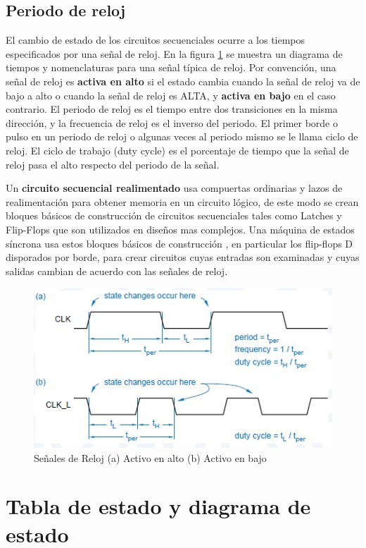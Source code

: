 \documentclass[12pt]{book}
\theoremstyle{definition}
\theoremstyle{remark}
\theoremstyle{plain}
\begin{document}
\subsection{Periodo de reloj}

El cambio de estado de los circuitos secuenciales ocurre a los tiempos especificados por una señal de reloj. En la figura \ref{fig13} se muestra un diagrama de tiempos y nomenclaturas para una señal típica de reloj. Por convención, una señal de reloj es \textbf{activa en alto} si el estado cambia cuando la señal de reloj va de bajo a alto o cuando la señal de reloj es ALTA, y \textbf{activa en bajo }en el caso contrario. El periodo de reloj es el tiempo entre dos transiciones en la misma dirección, y la frecuencia de reloj es el inverso del periodo. El primer borde o pulso en un periodo de reloj o algunas veces al  periodo mismo se le llama ciclo de reloj. El ciclo de trabajo (duty cycle) es el porcentaje de tiempo que la señal de reloj pasa el alto respecto del periodo de la señal.

Un \textbf{circuito secuencial realimentado} usa compuertas ordinarias y lazos de realimentación para obtener memoria en un circuito lógico, de este modo se crean bloques básicos de construcción de circuitos secuenciales tales como Latches y Flip-Flops que son utilizados en diseños mas complejos. Una máquina de estados síncrona usa estos bloques básicos de construcción , en particular los flip-flops D disporados por borde, para crear circuitos cuyas entradas son examinadas y cuyas salidas cambian de acuerdo con las señales de reloj. 

\begin{figure}
\centering
\includegraphics[width=5in]{reloj.jpg}
\caption{Señales de Reloj (a) Activo en alto (b) Activo en bajo}
\label{fig13}
\end{figure}


\section{Tabla de estado y diagrama de estado}
\end{document}
